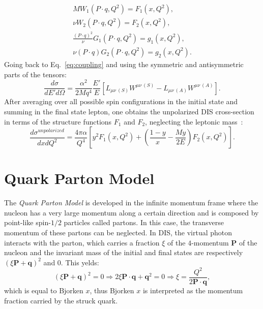 %
\begin{equation}
  \begin{split}
    MW_1(P\cdot q,Q^2)=F_1(x,Q^2), \\
    \nu W_2(P\cdot q,Q^2)=F_2(x,Q^2), \\
    \frac{(P\cdot q)^2}{\nu}G_1(P\cdot q,Q^2)=g_1(x,Q^2), \\
    \nu(P\cdot q)G_2(P\cdot q,Q^2)=g_2(x,Q^2).
  \end{split}
  \label{eq:dimless}
\end{equation}
%
Going back to Eq.~\ref{eq:coupling} and using the symmetric and antisymmetric parts of the tensors:
%
\begin{equation}
  \frac{d\sigma}{dE'd\Omega} = \frac{\alpha^2}{2Mq^4}\frac{E'}{E}\left[L_{\mu\nu\ (S)}W^{\mu\nu\ (S)}-L_{\mu\nu\ (A)}W^{\mu\nu\ (A)}\right].
\end{equation}
%
After averaging over all possible spin configurations in the initial state and summing in the final state lepton, one obtains the unpolarized DIS cross-section in terms of the structure functions $F_1$ and $F_2$, neglecting the leptonic mass~:
%
\begin{equation}
  \frac{d\sigma^{unpolarized}}{dxdQ^2} = \frac{4\pi\alpha}{Q^4}\left[y^2F_1(x,Q^2)+\left(\frac{1-y}{x}-\frac{My}{2E}\right)F_2(x,Q^2)\right].
  \label{eq:unpolDIS}
\end{equation}


\section{Quark Parton Model}

The \textit{Quark Parton Model} \cite{Bjorken,Feynman} is developed in the infinite momentum frame where the nucleon has a very large momentum along a certain direction and is composed by point-like spin-$1/2$ particles called partons. In this case, the transverse momentum of these partons can be neglected. In DIS, the virtual photon interacts with the parton, which carries a fraction $\xi$ of the $4$-momentum \textbf{P} of the nucleon and the invariant mass of the initial and final states are respectively $(\xi\textbf{P}+\textbf{q})^2$ and $0$. This yelds:
%
\begin{equation}
  (\xi\textbf{P}+\textbf{q})^2 = 0 \Rightarrow 2\xi\textbf{P}\cdot\textbf{q}+\textbf{q}^2 = 0 \Rightarrow \xi = \frac{Q^2}{2\textbf{P}\cdot\textbf{q}},
\end{equation}
%
which is equal to Bjorken $x$, thus Bjorken $x$ is interpreted as the momentum fraction carried by the struck quark.

